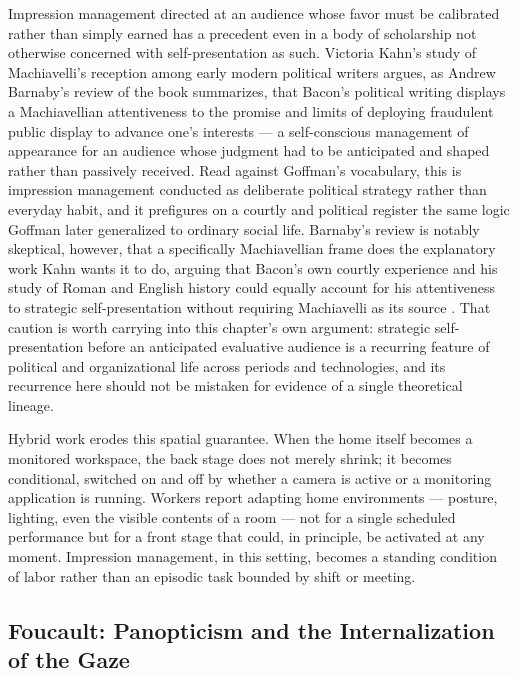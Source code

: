 \documentclass[10pt]{article}
\begin{document}
Impression management directed at an audience whose favor must be calibrated rather than simply earned has a precedent even in a body of scholarship not otherwise concerned with self-presentation as such. Victoria Kahn's study of Machiavelli's reception among early modern political writers argues, as Andrew Barnaby's review of the book summarizes, that Bacon's political writing displays a Machiavellian attentiveness to the promise and limits of deploying fraudulent public display to advance one's interests \cite{kahn,barnaby} --- a self-conscious management of appearance for an audience whose judgment had to be anticipated and shaped rather than passively received. Read against Goffman's vocabulary, this is impression management conducted as deliberate political strategy rather than everyday habit, and it prefigures on a courtly and political register the same logic Goffman later generalized to ordinary social life. Barnaby's review is notably skeptical, however, that a specifically Machiavellian frame does the explanatory work Kahn wants it to do, arguing that Bacon's own courtly experience and his study of Roman and English history could equally account for his attentiveness to strategic self-presentation without requiring Machiavelli as its source \cite{barnaby}. That caution is worth carrying into this chapter's own argument: strategic self-presentation before an anticipated evaluative audience is a recurring feature of political and organizational life across periods and technologies, and its recurrence here should not be mistaken for evidence of a single theoretical lineage.

Hybrid work erodes this spatial guarantee. When the home itself becomes a monitored workspace, the back stage does not merely shrink; it becomes conditional, switched on and off by whether a camera is active or a monitoring application is running. Workers report adapting home environments --- posture, lighting, even the visible contents of a room --- not for a single scheduled performance but for a front stage that could, in principle, be activated at any moment. Impression management, in this setting, becomes a standing condition of labor rather than an episodic task bounded by shift or meeting.

\subsection{Foucault: Panopticism and the Internalization of the Gaze}
\end{document}

